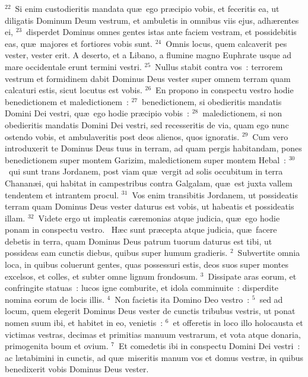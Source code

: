 ${}^{22}$~Si enim custodieritis mandata qu\ae\ ego pr\ae cipio vobis, et feceritis ea, ut diligatis Dominum Deum vestrum, et ambuletis in omnibus viis ejus, adh\ae rentes ei,
${}^{23}$~disperdet Dominus omnes gentes istas ante faciem vestram, et possidebitis eas, qu\ae\ majores et fortiores vobis sunt.
${}^{24}$~Omnis locus, quem calcaverit pes vester, vester erit. A deserto, et a Libano, a flumine magno Euphrate usque ad mare occidentale erunt termini vestri.
${}^{25}$~Nullus stabit contra vos~: terrorem vestrum et formidinem dabit Dominus Deus vester super omnem terram quam calcaturi estis, sicut locutus est vobis.
${}^{26}$~En propono in conspectu vestro hodie benedictionem et maledictionem~:
${}^{27}$~benedictionem, si obedieritis mandatis Domini Dei vestri, qu\ae\ ego hodie pr\ae cipio vobis~:
${}^{28}$~maledictionem, si non obedieritis mandatis Domini Dei vestri, sed recesseritis de via, quam ego nunc ostendo vobis, et ambulaveritis post deos alienos, quos ignoratis.
${}^{29}$~Cum vero introduxerit te Dominus Deus tuus in terram, ad quam pergis habitandam, pones benedictionem super montem Garizim, maledictionem super montem Hebal~:
${}^{30}$~qui sunt trans Jordanem, post viam qu\ae\ vergit ad solis occubitum in terra Chanan\ae i, qui habitat in campestribus contra Galgalam, qu\ae\ est juxta vallem tendentem et intrantem procul.
${}^{31}$~Vos enim transibitis Jordanem, ut possideatis terram quam Dominus Deus vester daturus est vobis, ut habeatis et possideatis illam.
${}^{32}$~Videte ergo ut impleatis c\ae remonias atque judicia, qu\ae\ ego hodie ponam in conspectu vestro.
~\lettrine[lines=10,image=true,loversize=0.05,lraise=-0.03]{H}{}\ae c sunt pr\ae cepta atque judicia, qu\ae\ facere debetis in terra, quam Dominus Deus patrum tuorum daturus est tibi, ut possideas eam cunctis diebus, quibus super humum gradieris.
${}^{2}$~Subvertite omnia loca, in quibus coluerunt gentes, quas possessuri estis, deos suos super montes excelsos, et colles, et subter omne lignum frondosum.
${}^{3}$~Dissipate aras eorum, et confringite statuas~: lucos igne comburite, et idola comminuite~: disperdite nomina eorum de locis illis.
${}^{4}$~Non facietis ita Domino Deo vestro~:
${}^{5}$~sed ad locum, quem elegerit Dominus Deus vester de cunctis tribubus vestris, ut ponat nomen suum ibi, et habitet in eo, venietis~:
${}^{6}$~et offeretis in loco illo holocausta et victimas vestras, decimas et primitias manuum vestrarum, et vota atque donaria, primogenita boum et ovium.
${}^{7}$~Et comedetis ibi in conspectu Domini Dei vestri~: ac l\ae tabimini in cunctis, ad qu\ae\ miseritis manum vos et domus vestr\ae , in quibus benedixerit vobis Dominus Deus vester.
